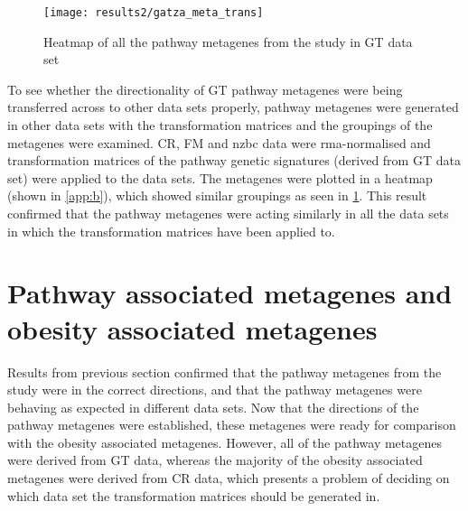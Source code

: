 \begin{figure}[htpb]
	\centering
	\texttt{[image: results2/gatza\_meta\_trans]}
	\caption{Heatmap of all the pathway metagenes from the \citet{Gatza2010a} study in GT data set}
	\label{fig:gatza_meta_dir}
\end{figure}

To see whether the directionality of GT pathway metagenes were being transferred across to other data sets properly, pathway metagenes were generated in other data sets with the transformation matrices and the groupings of the metagenes were examined.
CR, FM and \gls{nzbc} data were \gls{rma}-normalised and transformation matrices of the pathway genetic signatures (derived from GT data set) were applied to the data sets.
The metagenes were plotted in a heatmap (shown in \cref{app:b}), which showed similar groupings  as seen in \cref{fig:gatza_meta_dir}.
This result confirmed that the pathway metagenes were acting similarly in all the data sets in which the transformation matrices have been applied to.


\section{Pathway associated metagenes and obesity associated metagenes}
\label{sec:pathway_associated_metagenes_and_obesity_associated_metagenes}

Results from previous section confirmed that the pathway metagenes from the \citet{Gatza2010a} study were in the correct directions, and that the pathway metagenes were behaving as expected in different data sets.
Now that the directions of the pathway metagenes were established, these metagenes were ready for comparison with the obesity associated metagenes.
However, all of the pathway metagenes were derived from GT data, whereas the majority of the obesity associated metagenes were derived from CR data, which presents a problem of deciding on which data set the transformation matrices should be generated in.

